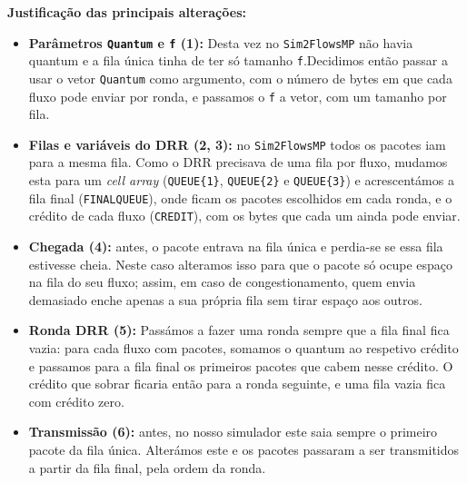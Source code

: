 \documentclass[11pt,a4paper]{article}
\newcommand{\code}[1]{\texttt{#1}}
\begin{document}
\textbf{Justificação das principais alterações:}
\begin{itemize}
  \item \textbf{Parâmetros \code{Quantum} e \code{f} (1):} Desta vez no \code{Sim2FlowsMP} não havia quantum e a fila única tinha de ter só tamanho \code{f}.Decidimos então passar a usar o vetor \code{Quantum} como argumento, com o número de bytes em que cada fluxo pode enviar por ronda, e passamos o \code{f} a vetor, com um tamanho por fila.
  \item \textbf{Filas e variáveis do DRR (2, 3):} no \code{Sim2FlowsMP} todos os pacotes iam para a mesma fila. Como o DRR precisava de uma fila por fluxo, mudamos esta para um \textit{cell array} (\code{QUEUE\{1\}}, \code{QUEUE\{2\}} e \code{QUEUE\{3\}}) e acrescentámos a fila final (\code{FINALQUEUE}), onde ficam os pacotes escolhidos em cada ronda, e o crédito de cada fluxo (\code{CREDIT}), com os bytes que cada um ainda pode enviar.
  \item \textbf{Chegada (4):} antes, o pacote entrava na fila única e perdia-se se essa fila estivesse cheia.
  Neste caso alteramos isso para que o pacote só ocupe espaço na fila do seu fluxo; assim, em caso de congestionamento, quem envia demasiado enche apenas a sua própria fila sem tirar espaço aos outros.
  \item \textbf{Ronda DRR (5):} Passámos a fazer uma ronda sempre que a fila final fica vazia: para cada fluxo com pacotes, somamos o quantum ao respetivo crédito e passamos para a fila final os primeiros pacotes que cabem nesse crédito. O crédito que sobrar ficaria então para a ronda seguinte, e uma fila vazia fica com crédito zero.
  \item \textbf{Transmissão (6):} antes, no nosso simulador este saia sempre o primeiro pacote da fila única. Alterámos este e os pacotes passaram a ser transmitidos a partir da fila final, pela ordem da ronda.
\end{itemize}

\vspace{6em}
\end{document}
